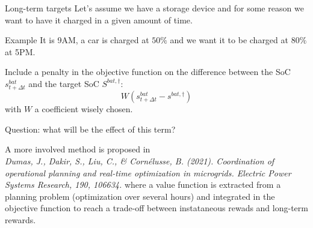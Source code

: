 \begin{frame}[allowframebreaks]{Long-term targets}
    Let's assume we have a storage device and for some reason we want to have it charged in a given amount of time.
    \begin{block}{Example}
        It is 9AM, a car is charged at $50\%$ and we want it to be charged at $80\%$ at 5PM.
    \end{block}

    Include a penalty in the objective function on the difference between the SoC $s^{bat}_{t+\Delta t}$ and the target SoC $S^{bat, \dagger}$:
    $$W (s^{bat}_{t+\Delta t} - s^{bat, \dagger})$$
    with $W$ a coefficient wisely chosen.

    Question: what will be the effect of this term?

    A more involved method is proposed in \\
    \textit{Dumas, J., Dakir, S., Liu, C., \& Cornélusse, B. (2021). Coordination of operational planning and real-time optimization in microgrids. Electric Power Systems Research, 190, 106634.}
    where a value function is extracted from a planning problem (optimization over several hours) and integrated in the objective function to reach a trade-off between instataneous rewads and long-term rewards.
\end{frame}


